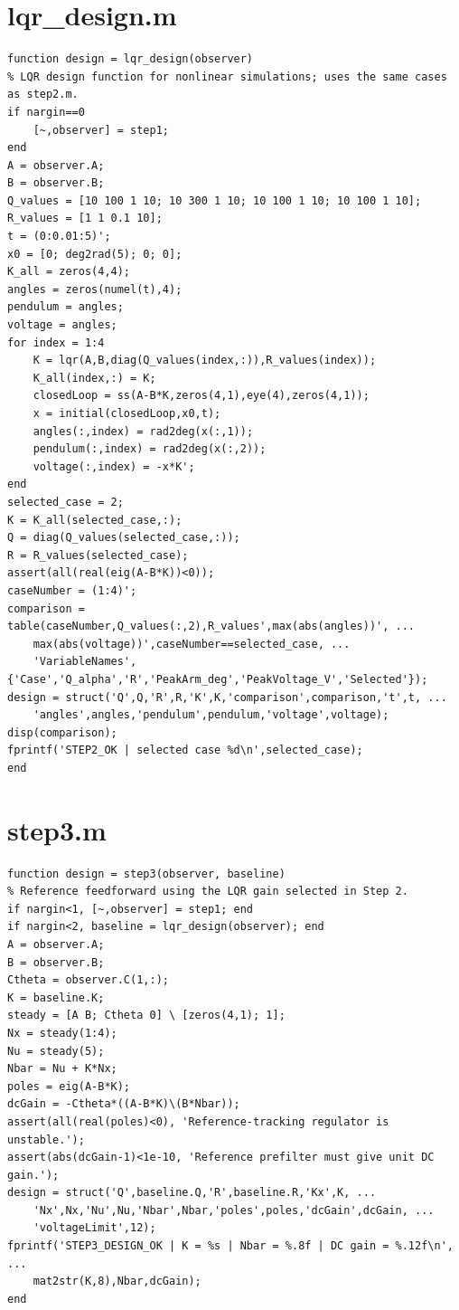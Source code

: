 \documentclass[conference]{IEEEtran}
\begin{document}
\noindent\begin{minipage}{\columnwidth}
\section{lqr\_design.m}
\begin{lstlisting}
function design = lqr_design(observer)
% LQR design function for nonlinear simulations; uses the same cases as step2.m.
if nargin==0
    [~,observer] = step1;
end
A = observer.A;
B = observer.B;
Q_values = [10 100 1 10; 10 300 1 10; 10 100 1 10; 10 100 1 10];
R_values = [1 1 0.1 10];
t = (0:0.01:5)';
x0 = [0; deg2rad(5); 0; 0];
K_all = zeros(4,4);
angles = zeros(numel(t),4);
pendulum = angles;
voltage = angles;
for index = 1:4
    K = lqr(A,B,diag(Q_values(index,:)),R_values(index));
    K_all(index,:) = K;
    closedLoop = ss(A-B*K,zeros(4,1),eye(4),zeros(4,1));
    x = initial(closedLoop,x0,t);
    angles(:,index) = rad2deg(x(:,1));
    pendulum(:,index) = rad2deg(x(:,2));
    voltage(:,index) = -x*K';
end
selected_case = 2;
K = K_all(selected_case,:);
Q = diag(Q_values(selected_case,:));
R = R_values(selected_case);
assert(all(real(eig(A-B*K))<0));
caseNumber = (1:4)';
comparison = table(caseNumber,Q_values(:,2),R_values',max(abs(angles))', ...
    max(abs(voltage))',caseNumber==selected_case, ...
    'VariableNames',{'Case','Q_alpha','R','PeakArm_deg','PeakVoltage_V','Selected'});
design = struct('Q',Q,'R',R,'K',K,'comparison',comparison,'t',t, ...
    'angles',angles,'pendulum',pendulum,'voltage',voltage);
disp(comparison);
fprintf('STEP2_OK | selected case %d\n',selected_case);
end
\end{lstlisting}
\end{minipage}
\par\medskip

\noindent\begin{minipage}{\columnwidth}
\section{step3.m}
\begin{lstlisting}
function design = step3(observer, baseline)
% Reference feedforward using the LQR gain selected in Step 2.
if nargin<1, [~,observer] = step1; end
if nargin<2, baseline = lqr_design(observer); end
A = observer.A;
B = observer.B;
Ctheta = observer.C(1,:);
K = baseline.K;
steady = [A B; Ctheta 0] \ [zeros(4,1); 1];
Nx = steady(1:4);
Nu = steady(5);
Nbar = Nu + K*Nx;
poles = eig(A-B*K);
dcGain = -Ctheta*((A-B*K)\(B*Nbar));
assert(all(real(poles)<0), 'Reference-tracking regulator is unstable.');
assert(abs(dcGain-1)<1e-10, 'Reference prefilter must give unit DC gain.');
design = struct('Q',baseline.Q,'R',baseline.R,'Kx',K, ...
    'Nx',Nx,'Nu',Nu,'Nbar',Nbar,'poles',poles,'dcGain',dcGain, ...
    'voltageLimit',12);
fprintf('STEP3_DESIGN_OK | K = %s | Nbar = %.8f | DC gain = %.12f\n', ...
    mat2str(K,8),Nbar,dcGain);
end
\end{lstlisting}
\end{minipage}
\par\medskip
\end{document}
